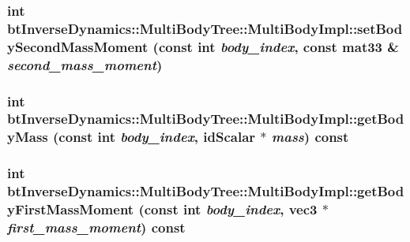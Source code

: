  \hypertarget{classbt_inverse_dynamics_1_1_multi_body_tree_1_1_multi_body_impl_dc1e2a8408ad2e37469f47280d19536f}{
\subsubsection[setBodySecondMassMoment]{\setlength{\rightskip}{0pt plus 5cm}int btInverseDynamics::MultiBodyTree::MultiBodyImpl::setBodySecondMassMoment (const int {\em body\_\-index}, \/  const mat33 \& {\em second\_\-mass\_\-moment})}}
\label{classbt_inverse_dynamics_1_1_multi_body_tree_1_1_multi_body_impl_dc1e2a8408ad2e37469f47280d19536f}


 \hypertarget{classbt_inverse_dynamics_1_1_multi_body_tree_1_1_multi_body_impl_979fa0066a08422f5b8c1c32e02de8a7}{
\subsubsection[getBodyMass]{\setlength{\rightskip}{0pt plus 5cm}int btInverseDynamics::MultiBodyTree::MultiBodyImpl::getBodyMass (const int {\em body\_\-index}, \/  idScalar $\ast$ {\em mass}) const}}
\label{classbt_inverse_dynamics_1_1_multi_body_tree_1_1_multi_body_impl_979fa0066a08422f5b8c1c32e02de8a7}


 \hypertarget{classbt_inverse_dynamics_1_1_multi_body_tree_1_1_multi_body_impl_67093942de357aa1b3013ed4c342c1de}{
\subsubsection[getBodyFirstMassMoment]{\setlength{\rightskip}{0pt plus 5cm}int btInverseDynamics::MultiBodyTree::MultiBodyImpl::getBodyFirstMassMoment (const int {\em body\_\-index}, \/  {\bf vec3} $\ast$ {\em first\_\-mass\_\-moment}) const}}
\label{classbt_inverse_dynamics_1_1_multi_body_tree_1_1_multi_body_impl_67093942de357aa1b3013ed4c342c1de}



